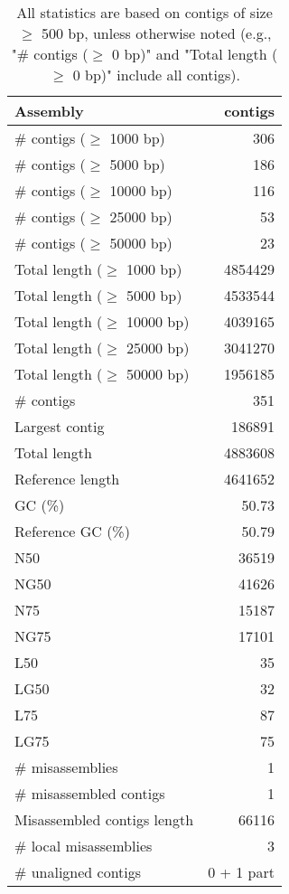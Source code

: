 \documentclass[12pt,a4paper]{article}
\begin{document}
\begin{table}[ht]
\begin{center}
\caption{All statistics are based on contigs of size $\geq$ 500 bp, unless otherwise noted (e.g., "\# contigs ($\geq$ 0 bp)" and "Total length ($\geq$ 0 bp)" include all contigs).}
\begin{tabular}{|l*{1}{|r}|}
\hline
Assembly & contigs \\ \hline
\# contigs ($\geq$ 1000 bp) & 306 \\ \hline
\# contigs ($\geq$ 5000 bp) & 186 \\ \hline
\# contigs ($\geq$ 10000 bp) & 116 \\ \hline
\# contigs ($\geq$ 25000 bp) & 53 \\ \hline
\# contigs ($\geq$ 50000 bp) & 23 \\ \hline
Total length ($\geq$ 1000 bp) & 4854429 \\ \hline
Total length ($\geq$ 5000 bp) & 4533544 \\ \hline
Total length ($\geq$ 10000 bp) & 4039165 \\ \hline
Total length ($\geq$ 25000 bp) & 3041270 \\ \hline
Total length ($\geq$ 50000 bp) & 1956185 \\ \hline
\# contigs & 351 \\ \hline
Largest contig & 186891 \\ \hline
Total length & 4883608 \\ \hline
Reference length & 4641652 \\ \hline
GC (\%) & 50.73 \\ \hline
Reference GC (\%) & 50.79 \\ \hline
N50 & 36519 \\ \hline
NG50 & 41626 \\ \hline
N75 & 15187 \\ \hline
NG75 & 17101 \\ \hline
L50 & 35 \\ \hline
LG50 & 32 \\ \hline
L75 & 87 \\ \hline
LG75 & 75 \\ \hline
\# misassemblies & 1 \\ \hline
\# misassembled contigs & 1 \\ \hline
Misassembled contigs length & 66116 \\ \hline
\# local misassemblies & 3 \\ \hline
\# unaligned contigs & 0 + 1 part \\ \hline

\end{tabular}
\end{center}
\end{table}
\end{document}
